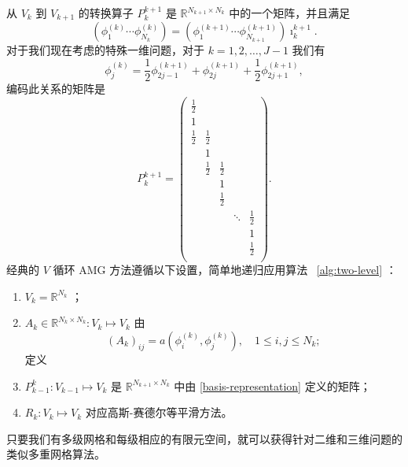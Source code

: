 \documentclass[12pt]{acta_2011xz}
\begin{document}
从    $V_k$    到    $V_{k+1}$    的转换算子    $P_{k}^{k+1}$    是    $\mathbb R^{N_{k+1}\times N_k}$    中的一个矩阵，并且满足 
   \begin{equation}\label{basis-representation}
    (\phi_1^{(k)} \cdots \phi_{N_k}^{(k)})=(\phi_1^{(k+1)} \cdots \phi_{N_{k+1}}^{(k+1)})\imath_{k}^{k+1}.
\end{equation}    对于我们现在考虑的特殊一维问题，对于    $k=1, 2, \dots, J-1$    我们有 
   \begin{equation}\label{gmg-basis-1d}
    \phi_{j}^{(k)}=\frac12\phi_{2j-1}^{(k+1)}+\phi_{2j}^{(k+1)}+\frac12\phi_{2j+1}^{(k+1)},
\end{equation}    编码此关系的矩阵是
   \begin{equation}\label{p-gmg-1d}
    P_{k}^{k+1} =\begin{pmatrix}
        \frac{1}{2} & & & & \\ 
        1 & & & \\ 
        \frac{1}{2} & \frac{1}{2} & & & \\ 
        & 1 & &  \\ 
        & \frac{1}{2} & \frac{1}{2} & \\ 
        & & 1 & & \\  
        & & \frac{1}{2} & & \\  
        & & & \ddots &\frac{1}{2} \\ 
        & & & &  1 \\ 
        & & & &  \frac{1}{2} \\ 
    \end{pmatrix}.
\end{equation}    经典的    $V$    循环 AMG 方法遵循以下设置，简单地递归应用算法~    \ref{alg:two-level}   ：
   \begin{enumerate}[1.]

    \item      $V_k=\mathbb R^{N_k}$   ；   \item      $A_k\in \mathbb R^{N_k\times N_k}: V_k\mapsto V_k$    由    $$
            (A_k)_{ij}= a(\phi_{i}^{(k)}, \phi_{j}^{(k)}), \quad 1\le i, j\le N_k;
        $$    定义   \item      $P_{k-1}^k: V_{k-1}\mapsto V_k$    是    $\mathbb R^{N_{k+1}\times N_{k}}$    中由    \eqref{basis-representation}    定义的矩阵；   \item      $R_k: V_k\mapsto V_k$    对应高斯-赛德尔等平滑方法。  \end{enumerate}    只要我们有多级网格和每级相应的有限元空间，就可以获得针对二维和三维问题的类似多重网格算法。  
\end{document}
